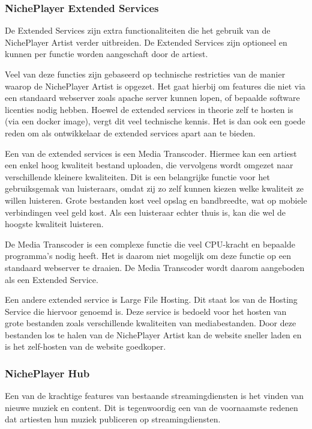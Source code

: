 \subsubsection*{NichePlayer Extended Services}
De Extended Services zijn extra functionaliteiten die het gebruik van de NichePlayer Artist verder uitbreiden. De Extended Services zijn optioneel en kunnen per functie worden aangeschaft door de artiest.

Veel van deze functies zijn gebaseerd op technische restricties van de manier waarop de NichePlayer Artist is opgezet. Het gaat hierbij om features die niet via een standaard webserver zoals apache server kunnen lopen, of bepaalde software licenties nodig hebben. Hoewel de extended services in theorie zelf te hosten is (via een docker image), vergt dit veel technische kennis. Het is dan ook een goede reden om als ontwikkelaar de extended services apart aan te bieden.

Een van de extended services is een Media Transcoder. Hiermee kan een artiest een enkel hoog kwaliteit bestand uploaden, die vervolgens wordt omgezet naar verschillende kleinere kwaliteiten. Dit is een belangrijke functie voor het gebruiksgemak van luisteraars, omdat zij zo zelf kunnen kiezen welke kwaliteit ze willen luisteren. Grote bestanden kost veel opslag en bandbreedte, wat op mobiele verbindingen veel geld kost. Als een luisteraar echter thuis is, kan die wel de hoogste kwaliteit luisteren.

De Media Transcoder is een complexe functie die veel CPU-kracht en bepaalde programma's  nodig heeft. Het is daarom niet mogelijk om deze functie op een standaard webserver te draaien. De Media Transcoder wordt daarom aangeboden als een Extended Service.

Een andere extended service is Large File Hosting. Dit staat los van de Hosting Service die hiervoor genoemd is. Deze service is bedoeld voor het hosten van grote bestanden zoals verschillende kwaliteiten van mediabestanden. Door deze bestanden los te halen van de NichePlayer Artist kan de website sneller laden en is het zelf-hosten van de website goedkoper.

\subsubsection*{NichePlayer Hub}
Een van de krachtige features van bestaande streamingdiensten is het vinden van nieuwe muziek en content. Dit is tegenwoordig een van de voornaamste redenen dat artiesten hun muziek publiceren op streamingdiensten.

